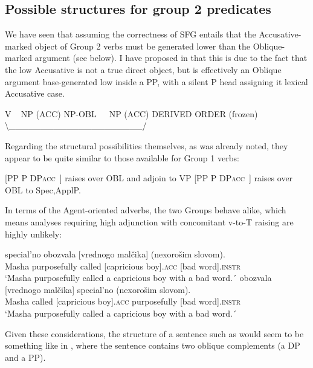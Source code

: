 \documentclass[output=paper,colorlinks,citecolor=brown,nonflat]{./langscibook}
\begin{document}
\subsection{Possible structures for group 2 predicates}\label{sec:antonyuk:4.2}

We have seen that assuming the correctness of SFG entails that the Accusative-marked object of Group 2 verbs must be generated lower than the Oblique-marked argument (see  below). I have proposed in \citet{Antonyuk2015} that this is due to the fact that the low Accusative is not a true direct object, but is effectively an Oblique argument base-generated low inside a PP, with a silent P head assigning it lexical Accusative case.

\ea%
    \label{ex:antonyuk:49}
    V ~ NP (ACC) NP-OBL~~~NP (ACC)  DERIVED ORDER (frozen)  ~                               {\textbackslash}\_\_\_\_\_\_\_\_\_\_\_\_\_\_\_\_\_\_\_\_\_/
    \z

Regarding the structural possibilities themselves, as was already noted, they appear to be quite similar to those available for Group 1 verbs:


\ea%
    \label{ex:antonyuk:50}
    \ea \label{ex:antonyuk:50a}{}
    [PP P DP\textsc{acc~}] raises over OBL and adjoin to VP
    \ex \label{ex:antonyuk:50b}{}
    [PP P DP\textsc{acc~]} raises over OBL to Spec,ApplP.
    \z
\z

In terms of the Agent-oriented adverbs, the two Groups behave alike, which means analyses requiring high adjunction with concomitant v-to-T raising are highly unlikely:

\ea%
    \label{ex:antonyuk:51}
    \ea \label{ex:antonyuk:51a}
       {special’no}    {obozvala} {[vrednogo}  {malčika]} {(nexorošim} {slovom)}.\\
    Masha purposefully called      [capricious boy].\textsc{acc} [bad word].\textsc{instr}\\
    \glt `Masha purposefully called a capricious boy with a bad word.´
    \ex \label{ex:antonyuk:51b}
      {obozvala} {[vrednogo} {malčika]}  {special’no}      {(nexorošim} {slovom)}.\\
    Masha called     [capricious boy].\textsc{acc} purposefully  [bad word].\textsc{instr}\\
    \glt `Masha purposefully called a capricious boy with a bad word.´
    \z
\z

Given these considerations, the structure of a sentence such as  would seem to be something like in , where the sentence contains two oblique complements (a DP and a PP).
\end{document}
